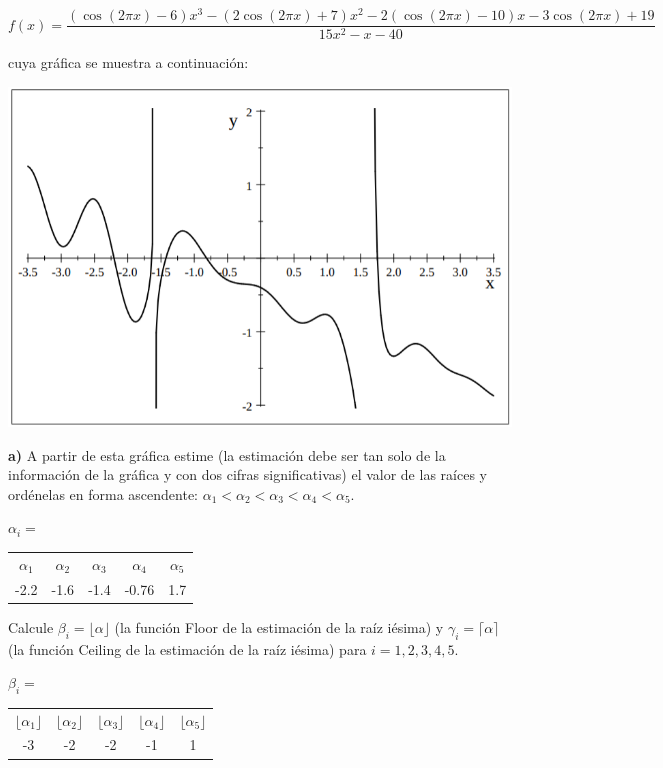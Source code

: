 \documentclass{article} %
\begin{document}
\begin{equation*}
    f(x) = \frac{(\cos{(2\pi x)}-6)x^3 - (2\cos{(2\pi x)}+7)x^2 - 2(\cos{(2\pi x)}-10)x - 3\cos{(2\pi x)} + 19}{15x^2-x-40}
\end{equation*}

cuya gráfica se muestra a continuación:
\begin{center}
\includegraphics[scale=0.5]{images/grafica2.png}
\end{center}

\textbf{a)} A partir de esta gráfica estime (la estimación debe ser tan solo de la información de la gráfica y con dos cifras significativas) el valor de las raíces y ordénelas en forma ascendente: $\alpha_1 < \alpha_2 < \alpha_3 < \alpha_4 < \alpha_5$.

\begin{center}
$\alpha_i = $
\begin{tabular}{c c c c c}
    $\alpha_1$ & $\alpha_2$ & $\alpha_3$ & $\alpha_4$ & $\alpha_5$ \\
     -2.2 & -1.6 & -1.4 & -0.76 & 1.7
\end{tabular}    
\end{center}

 Calcule $\beta_i = \lfloor \alpha \rfloor$ (la función Floor de
la estimación de la raíz iésima) y $\gamma_i = \lceil \alpha \rceil$ (la función Ceiling de la estimación
de la raíz iésima) para $i = 1, 2, 3, 4, 5$.


\begin{center}
$\beta_i = $
\begin{tabular}{c c c c c}
    $\lfloor \alpha_1 \rfloor$ & $\lfloor \alpha_2 \rfloor$ & $\lfloor \alpha_3 \rfloor$ & $\lfloor \alpha_4 \rfloor$ & $\lfloor \alpha_5 \rfloor$ \\
     -3 & -2 & -2 & -1 & 1
\end{tabular}    
\end{center}
\end{document}
